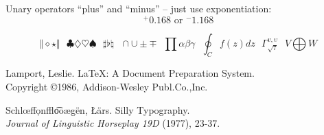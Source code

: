 \documentclass[12pt]{article}
\begin{document}
Unary operators ``plus'' and ``minus'' -- just use exponentiation:
$$	{}^{+}0.168  \mbox{ or } {}^{-}1.168	$$

$$  \Vert \diamond\star \Vert ~~~ \clubsuit\diamondsuit\heartsuit\spadesuit
 ~~~ \sharp\flat\natural ~~~ \cap\cup\pm\mp ~~~ \prod\alpha\beta\gamma
 ~~~ \oint_Cf(z)dz ~~~ \Gamma_{\sqrt7}^{v,\upsilon} ~~~ V\bigoplus W $$

\begin{thebibliography}{9}	%

 Lamport, Leslie.
\LaTeX : A Document Preparation System.  \\
Copyright \copyright 1986, Addison-Wesley Publ.Co.,Inc.

 Schl\oe ff\d{o}nffl\t{oo}\ae g\"{e}n,
\L\"{a}rs.  Silly Typography.		\\
{\em Journal of Linguistic Horseplay 19D} (1977), 23-37.

\end{thebibliography}
\end{document}

